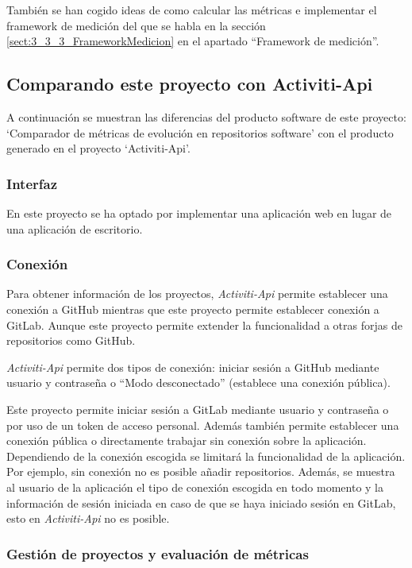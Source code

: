También se han cogido ideas de como calcular las métricas e implementar el framework de medición del que se habla en la sección \ref{sect:3_3_3_FrameworkMedicion} en el apartado ``Framework de medición''.

\subsection{Comparando este proyecto con Activiti-Api}

A continuación se muestran las diferencias del producto software de este proyecto: `Comparador de métricas de evolución en repositorios software' con el producto generado en el proyecto `Activiti-Api'.

\subsubsection{Interfaz}

En este proyecto se ha optado por implementar una aplicación web en lugar de una aplicación de escritorio.

\subsubsection{Conexión}

Para obtener información de los proyectos, \textit{Activiti-Api} permite establecer una conexión a GitHub mientras que este proyecto permite establecer conexión a GitLab. Aunque este proyecto permite extender la funcionalidad a otras forjas de repositorios como GitHub.

\textit{Activiti-Api} permite dos tipos de conexión: iniciar sesión a GitHub mediante usuario y contraseña o ``Modo desconectado'' (establece una conexión pública). 

Este proyecto permite iniciar sesión a GitLab mediante usuario y contraseña o por uso de un token de acceso personal. Además también permite establecer una conexión pública o directamente trabajar sin conexión sobre la aplicación. Dependiendo de la conexión escogida se limitará la funcionalidad de la aplicación. Por ejemplo, sin conexión no es posible añadir repositorios. Además, se muestra al usuario de la aplicación el tipo de conexión escogida en todo momento y la información de sesión iniciada en caso de que se haya iniciado sesión en GitLab, esto en \textit{Activiti-Api} no es posible.

\subsubsection{Gestión de proyectos y evaluación de métricas}

